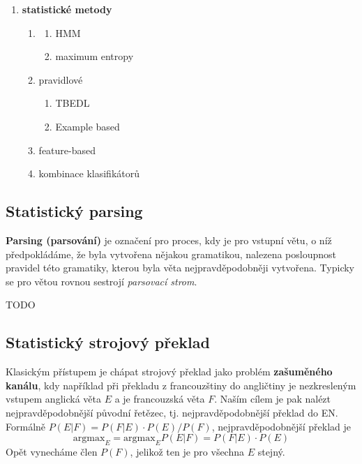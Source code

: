 \documentclass[11pt]{report} %
\numberwithin{equation}{section}
\begin{document}
\begin{enumerate}
	
	\item \textbf{statistické metody}
	\begin{enumerate}
		\item {}
		\begin{enumerate}
			\item HMM
			\item maximum entropy
		\end{enumerate}
		\item pravidlové
		\begin{enumerate}
			\item TBEDL
			\item Example based
		\end{enumerate}
		\item feature-based
		\item kombinace klasifikátorů
	\end{enumerate}
\end{enumerate}



\subsection{Statistický parsing}
\textbf{Parsing (parsování)} je označení pro proces, kdy je pro vstupní větu, o níž předpokládáme, že byla vytvořena nějakou gramatikou, nalezena posloupnost pravidel této gramatiky, kterou byla věta nejpravděpodobněji vytvořena. Typicky se pro větou rovnou sestrojí \textit{parsovací strom}.

TODO

\subsection{Statistický strojový překlad}
Klasickým přístupem je chápat strojový překlad jako problém \textbf{zašuměného kanálu}, kdy například při překladu z francouzštiny do angličtiny je nezkresleným vstupem anglická věta $E$ a  je francouzská věta $F$. Naším cílem je pak nalézt nejpravděpodobnější původní řetězec, tj. nejpravděpodobnější překlad do EN. Formálně $P(E|F) = P(F|E)\cdot P(E) / P(F)$, nejpravděpodobnější překlad je 
$$\text{argmax}_E = \text{argmax}_E P(E|F) = P(F|E)\cdot P(E)$$
Opět vynecháme člen $P(F)$, jelikož ten je pro všechna $E$ stejný.
\end{document}
